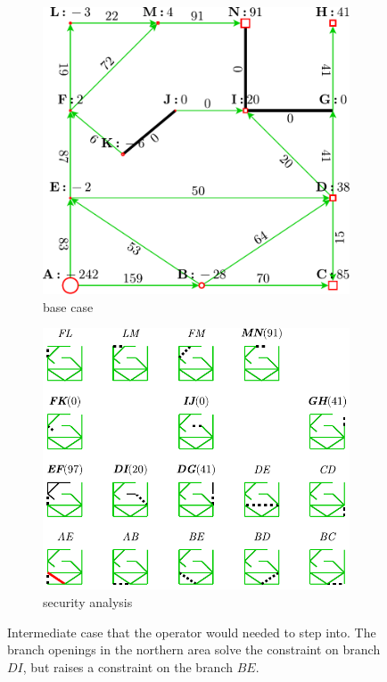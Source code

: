 \begin{figure}[h]
    \begin{subfigure}
        [t]{.43\linewidth}
        \includegraphics[width=\linewidth]{images/case_intermediate.pdf}
        \caption{base case}
        \label{fig:case intermediate}
    \end{subfigure}\hfill
    \begin{subfigure}
        [t]{.48\linewidth}
        \includegraphics[width=\linewidth]{images/grid_intermediate.pdf}
        \caption{security analysis}
        \label{fig:grid intermediate}
    \end{subfigure}
    \caption{Intermediate case that the operator would needed to step into. The branch
    openings in the northern area solve the constraint on branch $DI$, but
    raises a constraint on the branch $BE$. }
    \label{fig:intermediate}
\end{figure}

